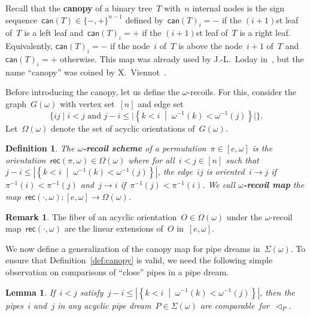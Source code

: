 \documentclass{amsart}
\newtheorem{lemma}[theorem]{Lemma}
\newtheorem{definition}[theorem]{Definition}
\theoremstyle{definition}
\newtheorem{remark}[theorem]{Remark}
\newcommand{\set}[2]{\left\{ #1 \;\middle|\; #2 \right\}} %
\newcommand{\bigset}[2]{\big\{ #1 \;|\; #2 \big\}} %
\newcommand{\defn}[1]{\textbf{\textsf{\color{PineGreen} #1}}} %
\newcommand{\acyclicPipeDreams}{\Sigma} %
\newcommand{\acyclicOrientations}{\Omega} %
\newcommand{\recoils}[2]{\mathsf{rec}(#1,#2)} %
\newcommand{\canopy}[1]{\mathsf{can}(#1)} %
\newcommand{\less}{\vartriangleleft} %
\newcommand{\contactLess}[1]{\less_{#1}} %
\begin{document}
Recall that the \defn{canopy} of a binary tree~$T$ with~$n$ internal nodes is the sign sequence~${\canopy{T} \in \{{-},{+}\}^{n-1}}$ defined by~$\canopy{T}_i = {-}$ if the $(i+1)$st leaf of~$T$ is a left leaf and~$\canopy{T}_i = {+}$ if the $(i+1)$st leaf of~$T$ is a right leaf. Equivalently, $\canopy{T}_i = -$ if the node~$i$ of~$T$ is above the node~$i+1$ of~$T$ and~$\canopy{T}_i = +$ otherwise. This map was already used by J.-L.~Loday in~\cite{LodayRonco, Loday}, but the name ``canopy'' was coined by X.~Viennot~\cite{Viennot}.

Before introducing the canopy, let us define the $\omega$-recoils. For this, consider the graph~$G(\omega)$ with vertex set~$[n]$ and edge set
\[
\bigset{ij}{i < j \text{ and } j-i \le |\set{k < i}{\omega^{-1}(k) < \omega^{-1}(j)}|}.
\]
Let~$\acyclicOrientations(\omega)$ denote the set of acyclic orientations of~$G(\omega)$.

\begin{definition}
The \defn{$\omega$-recoil scheme} of a permutation~$\pi \in [e,\omega]$ is the orientation~${\recoils{\pi}{\omega} \in \acyclicOrientations(\omega)}$ where for all~$i < j \in [n]$ such that~$j-i \le |\set{k < i}{\omega^{-1}(k) < \omega^{-1}(j)}|$, the edge~$ij$ is oriented~$i \to j$ if~$\pi^{-1}(i) < \pi^{-1}(j)$ and~$j \to i$ if~$\pi^{-1}(j) < \pi^{-1}(i)$. We call \defn{$\omega$-recoil map} the map~$\recoils{\cdot}{\omega} : [e,\omega] \to \acyclicOrientations(\omega)$.
\end{definition}

\begin{remark}
The fiber of an acyclic orientation~$O \in \acyclicOrientations(\omega)$ under the $\omega$-recoil map~$\recoils{\cdot}{\omega}$ are the linear extensions of~$O$ in~$[e,\omega]$.
\end{remark}

We now define a generalization of the canopy map for pipe dreams in~$\acyclicPipeDreams(\omega)$. To ensure that Definition~\ref{def:canopy} is valid, we need the following simple observation on comparisons of ``close'' pipes in a pipe dream.

\begin{lemma}
\label{lem:canopy}
If~$i < j$ satisfy~$j-i \le |\set{k < i}{\omega^{-1}(k) < \omega^{-1}(j)}|$, then the pipes~$i$ and~$j$ in any acyclic pipe dream~$P \in \acyclicPipeDreams(\omega)$ are comparable~for~$\contactLess{P}$.
\end{lemma}
\end{document}
